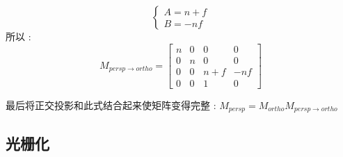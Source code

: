 \documentclass[UTF8,12pt]{ctexbook}
\begin{document}
{{{{{\begin{itemize}
{\begin{itemize}
{$$\begin{cases}
                            A = n + f \\
                            B = -nf
                          \end{cases}
                        $$
                        所以 : $$
                          M_{persp \to ortho}
                          =
                          \begin{bmatrix}
                            n & 0 & 0     & 0   \\
                            0 & n & 0     & 0   \\
                            0 & 0 & n + f & -nf \\
                            0 & 0 & 1     & 0
                          \end{bmatrix}
                        $$

                        最后将正交投影和此式结合起来使矩阵变得完整 : $M_{persp} = M_{ortho}M_{persp \to ortho}$
                        }
                \end{itemize}
                }
        \end{itemize}


      }%

    }%

    \subsection{光栅化}{

}}}}
\end{document}
